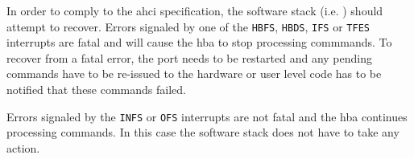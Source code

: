 In order to comply to the \ac{ahci} specification, the software stack (i.e.
\libahci) should attempt to recover. Errors signaled by one of the \verb+HBFS+,
\verb+HBDS+, \verb+IFS+ or \verb+TFES+ interrupts are fatal and will cause the
\ac{hba} to stop processing commmands. To recover from a fatal error, the port
needs to be restarted and any pending commands have to be re-issued to the
hardware or user level code has to be notified that these commands failed.

Errors signaled by the \verb+INFS+ or \verb+OFS+ interrupts are not fatal and
the \ac{hba} continues processing commands. In this case the software stack
does not have to take any action.
